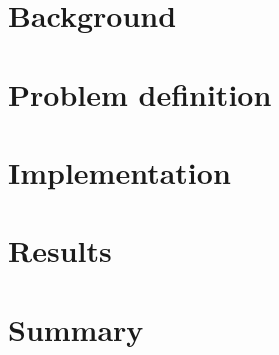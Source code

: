 \documentclass[english,12pt,a4paper,pdftex,sci,utf8]{aaltothesis}
\begin{document}
\thispagestyle{empty}


\clearpage

\section{Background}
\label{sec:background}

\clearpage

\section{Problem definition}
\label{sec:problem-definition}

\clearpage

\section{Implementation}
\label{sec:implementation}

\clearpage

\section{Results}
\label{sec:results}

\clearpage

\section{Summary} 
\label{sec:summary}

\clearpage


\end{document}

